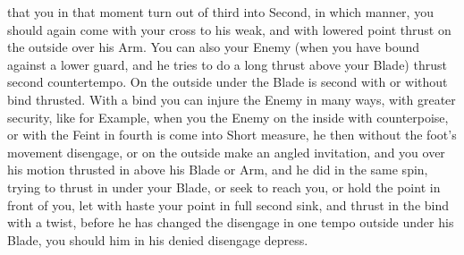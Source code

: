 that you in that moment turn out of third into Second, in which
manner, you should again come with your cross to his weak, and with
lowered point thrust on the outside over his Arm.
You can also your Enemy (when you have bound against a lower guard,
and he tries to do a long thrust above your Blade) thrust second
countertempo. On the outside under the Blade is second with or without
bind thrusted. With a bind you can injure the Enemy in many ways, with
greater security, like for Example, when you the Enemy on the inside
with counterpoise, or with the Feint in fourth is come into Short measure,
he then without the foot's movement disengage, or on the outside make
an angled invitation, and you over his motion thrusted in above his Blade
or Arm, and he did in the same spin,
trying to thrust in under your Blade, or seek to reach you, or hold
the point in front of you, let with haste your point in full second
sink, and thrust in the bind with a twist, before he has changed the
disengage in one tempo outside under his Blade, you should him in his
denied disengage depress.

